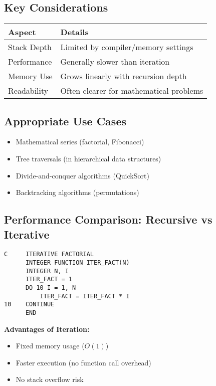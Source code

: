 \documentclass{book}
\begin{document}
\subsection*{Key Considerations}
\begin{center}
\begin{tabular}{|l|l|}
\hline
\textbf{Aspect} & \textbf{Details} \\ 
\hline
Stack Depth & Limited by compiler/memory settings \\
Performance & Generally slower than iteration \\
Memory Use & Grows linearly with recursion depth \\
Readability & Often clearer for mathematical problems \\
\hline
\end{tabular}
\end{center}

\subsection*{Appropriate Use Cases}
\begin{itemize}
\item Mathematical series (factorial, Fibonacci)
\item Tree traversals (in hierarchical data structures)
\item Divide-and-conquer algorithms (QuickSort)
\item Backtracking algorithms (permutations)
\end{itemize}

\subsection*{Performance Comparison: Recursive vs Iterative}
\begin{verbatim}
C     ITERATIVE FACTORIAL
      INTEGER FUNCTION ITER_FACT(N)
      INTEGER N, I
      ITER_FACT = 1
      DO 10 I = 1, N
          ITER_FACT = ITER_FACT * I
10    CONTINUE
      END
\end{verbatim}

\textbf{Advantages of Iteration:}
\begin{itemize}
\item Fixed memory usage (\( O(1) \))
\item Faster execution (no function call overhead)
\item No stack overflow risk
\end{itemize}
\end{document}
